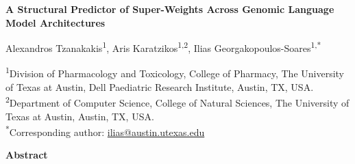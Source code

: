 \documentclass[11pt]{article}
\begin{document}
\begin{center}
{\large\bfseries A Structural Predictor of Super-Weights Across
Genomic Language Model Architectures}

\vspace{6pt}
{\normalsize
Alexandros Tzanakakis\textsuperscript{1},
Aris Karatzikos\textsuperscript{1,2},
Ilias Georgakopoulos-Soares\textsuperscript{1,*}
}

\vspace{6pt}
{\small
\textsuperscript{1}Division of Pharmacology and Toxicology, College of
Pharmacy, The University of Texas at Austin, Dell Paediatric Research
Institute, Austin, TX, USA.\\
\textsuperscript{2}Department of Computer Science, College of Natural
Sciences, The University of Texas at Austin, Austin, TX, USA.\\
\textsuperscript{*}Corresponding author:
\href{mailto:ilias@austin.utexas.edu}{ilias@austin.utexas.edu}
}
\end{center}

\vspace{6pt}

\textbf{Abstract}
\end{document}
